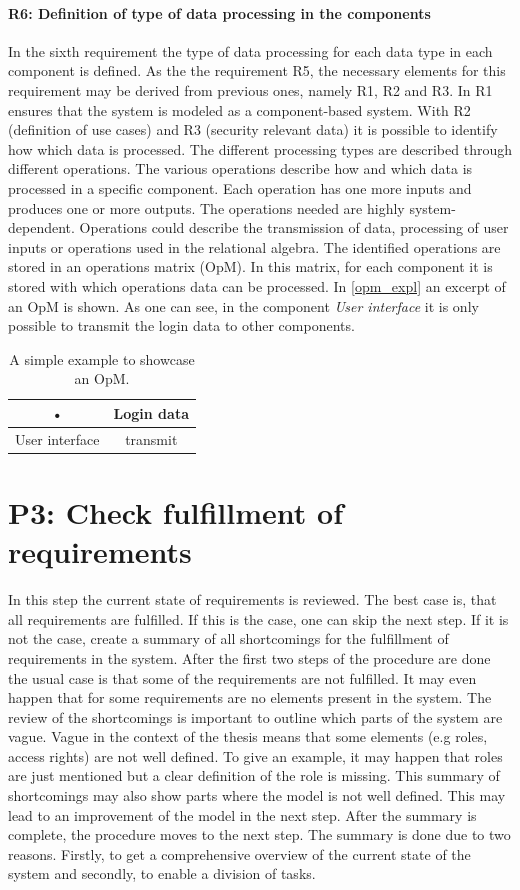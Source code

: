 \paragraph{R6: Definition of type of data processing in the components}
In the sixth requirement the type of data processing for each data type in each component is defined. As the the requirement R5, the necessary elements for this requirement may be derived from previous ones, namely R1, R2 and R3. In R1 ensures that the system is modeled as a component-based system. With R2 (definition of use cases) and R3 (security relevant data) it is possible to identify how which data is processed. The different processing types are described through different operations. The various operations describe how and which data is processed in a specific component. Each operation has one more inputs and produces one or more outputs. The  operations needed are highly system-dependent. Operations could describe the transmission of data, processing of user inputs or operations used in the relational algebra. The identified operations are stored in an operations matrix (OpM). In this matrix, for each component it is stored with which operations data can be processed.
In \autoref{opm_expl} an excerpt of an OpM is shown. As one can see, in the component \textit{User interface} it is only possible to transmit the login data to other components.

\begin{table}
\begin{tabular}{|c|c|}
\hline 
• & Login data \\ 
\hline 
User interface & transmit \\ 
\hline 
\end{tabular} 
\caption{A simple example to showcase an OpM.}
\label{opm_expl}
\end{table}

\section{P3: Check fulfillment of requirements}
\label{cs_check}
In this step the current state of requirements is reviewed. The best case is, that all requirements are fulfilled. If this is the case, one can skip the next step. If it is not the case, create a summary of all shortcomings for the fulfillment of requirements in the system. After the first two steps of the procedure are done the usual case is that some of the requirements are not fulfilled. It may even happen that for some requirements are no elements present in the system. The review of the shortcomings is important to outline which parts of the system are vague. Vague in the context of the thesis means that some elements (e.g roles, access rights) are not well defined. To give an example, it may happen that roles are just mentioned but a clear definition of the role is missing. This summary of shortcomings may also show parts where the model is not well defined. This may lead to an improvement of the model in the next step. After the summary is complete, the procedure moves to the next step. The summary is done due to two reasons. Firstly, to get a comprehensive overview of the current state of the system and secondly, to enable a division of tasks. 


